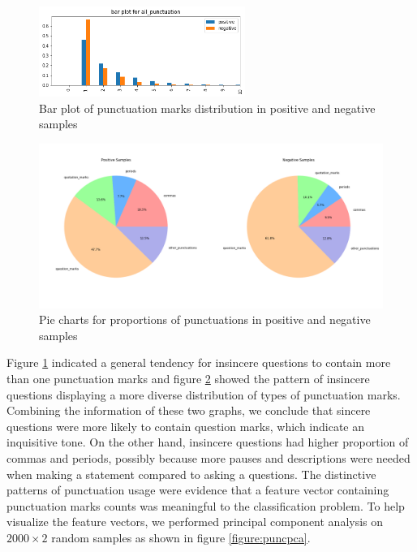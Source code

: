\documentclass[12pt]{diazessay} %
\begin{document}
{\begin{figure}[ht]
    \includegraphics[width=0.6\textwidth, center]{graphs/bar_punc/1.png}
    \caption{Bar plot of punctuation marks distribution in positive and negative samples}
    \label{figure:puncbar}
\end{figure}

\begin{figure}[ht] 
    \includegraphics[width=\textwidth, center]{graphs/puncpiecharts.png}
    \caption{Pie charts for proportions of punctuations in positive and negative samples}
    \medskip
    \small
    \label{figure:puncpie}
\end{figure}


Figure \ref{figure:puncbar} indicated a general tendency for insincere questions to contain more than one punctuation marks and figure \ref{figure:puncpie} showed the pattern of insincere questions displaying a more diverse distribution of types of punctuation marks. Combining the information of these two graphs, we conclude that sincere questions were more likely to contain question marks, which indicate an inquisitive tone. On the other hand, insincere questions had higher proportion of commas and periods, possibly because more pauses and descriptions were needed when making a statement compared to asking a questions. The distinctive patterns of punctuation usage were evidence that a feature vector containing punctuation marks counts was meaningful to the classification problem. To help visualize the feature vectors, we performed principal component analysis on $2000 \times 2$ random samples as shown in figure \ref{figure:puncpca}.

}
\end{document}
